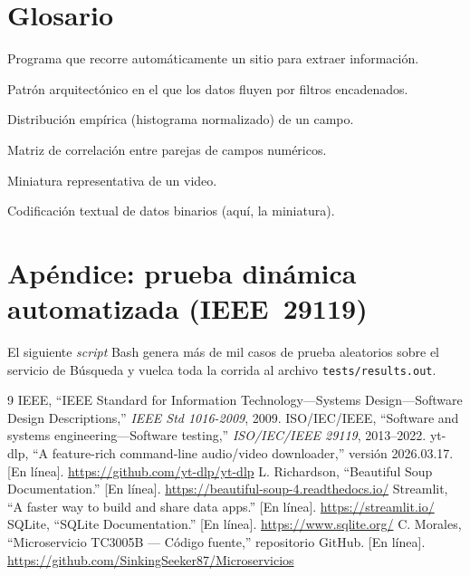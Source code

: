 \documentclass[11pt]{article}
\begin{document}
\section*{Glosario}
\begin{description}[leftmargin=2.6cm,style=nextline]
  \item[Crawler] Programa que recorre autom\'aticamente un sitio para extraer informaci\'on.
  \item[Tuber\'ia (pipe--filter)] Patr\'on arquitect\'onico en el que los datos fluyen por filtros encadenados.
  \item[Matriz de probabilidad] Distribuci\'on emp\'irica (histograma normalizado) de un campo.
  \item[Matriz de adyacencia] Matriz de correlaci\'on entre parejas de campos num\'ericos.
  \item[Thumbnail] Miniatura representativa de un video.
  \item[hex64 / base64] Codificaci\'on textual de datos binarios (aqu\'i, la miniatura).
\end{description}

\appendix
\section{Ap\'endice: prueba din\'amica automatizada (IEEE~29119)}\label{ap:bash}

El siguiente \emph{script} Bash genera m\'as de mil casos de prueba aleatorios
sobre el servicio de B\'usqueda y vuelca toda la corrida al archivo
\texttt{tests/results.out}.



\begin{thebibliography}{9}
 IEEE, ``IEEE Standard for Information Technology---Systems
Design---Software Design Descriptions,'' \emph{IEEE Std 1016-2009}, 2009.
 ISO/IEC/IEEE, ``Software and systems engineering---Software
testing,'' \emph{ISO/IEC/IEEE 29119}, 2013--2022.
 yt-dlp, ``A feature-rich command-line audio/video downloader,''
versi\'on 2026.03.17. [En l\'inea]. \url{https://github.com/yt-dlp/yt-dlp}
 L. Richardson, ``Beautiful Soup Documentation.'' [En l\'inea].
\url{https://beautiful-soup-4.readthedocs.io/}
 Streamlit, ``A faster way to build and share data apps.''
[En l\'inea]. \url{https://streamlit.io/}
 SQLite, ``SQLite Documentation.'' [En l\'inea].
\url{https://www.sqlite.org/}
 C. Morales, ``Microservicio TC3005B --- C\'odigo fuente,''
repositorio GitHub. [En l\'inea].
\url{https://github.com/SinkingSeeker87/Microservicios}
\end{thebibliography}
\end{document}
